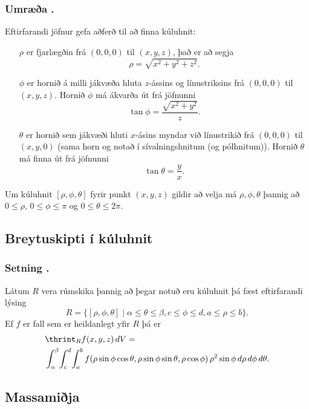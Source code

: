 \subsubsection{Umræða \kaflanr.}
Eftirfarandi jöfnur gefa aðferð til að finna kúluhnit:
\begin{itemize}
\item[$\rho$]  er fjarlægðin frá $(0,0,0)$ til $(x,y,z)$, það er að segja 
$$\rho=\sqrt{x^2+y^2+z^2}.$$
\item[$\phi$] er hornið á milli jákvæða hluta $z$-ássins og línustriksins frá $(0,0,0)$ til $(x,y,z)$.  Hornið $\phi$ má ákvarða út frá jöfnunni
$$\tan\phi=\frac{\sqrt{x^2+y^2}}{z}.$$
\item[$\theta$] er hornið sem jákvæði hluti $x$-ásins myndar við línustrikið frá $(0,0,0)$ til $(x,y,0)$ (sama horn og notað í sívalningshnitum (og pólhnitum)).   Hornið $\theta$ má finna út frá jöfnunni
$$\tan\theta=\frac{y}{x}.$$
\end{itemize}
Um kúluhnit $[\rho, \phi, \theta]$ fyrir punkt $(x,y,z)$ gildir að 
velja má $\rho, \phi, \theta$ þannig að
$0\leq \rho$, $0\leq\phi\leq \pi$ og $0\leq\theta\leq 2\pi$.





\subsection{Breytuskipti í kúluhnit} 

\subsubsection{Setning \kaflanr.}
 Látum $R$ vera rúmskika þannig að þegar notuð eru kúluhnit þá fæst eftirfarandi lýsing
$$R=\{[\rho,\phi,\theta]\mid \alpha\leq\theta\leq\beta, 
c\leq\phi\leq d, a\leq \rho\leq b\}.$$ 
Ef $f$ er fall sem er heildanlegt yfir $R$ þá er
\begin{align*}&\thrint_R f(x,y,z)\,dV=\\ &\int_\alpha^\beta\!\int_c^d\!\int_a^b f(\rho\sin\phi\cos\theta, \rho\sin\phi\sin\theta,\rho\cos\phi)
\,\rho^2\sin\phi\,d\rho\,d\phi\,d\theta.
\end{align*}





\subsection{Massamiðja} 

